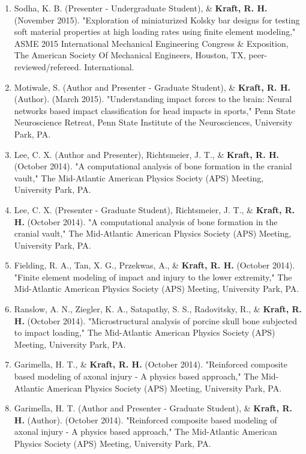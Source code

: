\documentclass[a4paper,10pt]{article}
\begin{document}
\begin{enumerate}
  \item Sodha, K. B. (Presenter - Undergraduate Student), \&
 \textbf{\textbf{Kraft,} R. H.} (November 2015). "Exploration of miniaturized Kolsky bar designs for testing soft material properties at high loading rates using finite element modeling," ASME 2015 International Mechanical Engineering Congress \&
 Exposition, The American Society Of Mechanical Engineers, Houston, TX, peer-reviewed/refereed. International.
  \item Motiwale, S. (Author and Presenter - Graduate Student), \&
 \textbf{\textbf{Kraft,} R. H.} (Author). (March 2015). "Understanding impact forces to the brain: Neural networks based impact classification for head impacts in sports," Penn State Neuroscience Retreat, Penn State Institute of the Neurosciences, University Park, PA.
  \item Lee, C. X. (Author and Presenter), Richtsmeier, J. T., \&
 \textbf{\textbf{Kraft,} R. H.} (October 2014). "A computational analysis of bone formation in the cranial vault," The Mid-Atlantic American Physics Society (APS) Meeting, University Park, PA.
  \item Lee, C. X. (Presenter - Graduate Student), Richtsmeier, J. T., \&
 \textbf{\textbf{Kraft,} R. H.} (October 2014). "A computational analysis of bone formation in the cranial vault," The Mid-Atlantic American Physics Society (APS) Meeting, University Park, PA.
  \item Fielding, R. A., Tan, X. G., Przekwas, A., \&
 \textbf{\textbf{Kraft,} R. H.} (October 2014). "Finite element modeling of impact and injury to the lower extremity," The Mid-Atlantic American Physics Society (APS) Meeting, University Park, PA.
  \item Ranslow, A. N., Ziegler, K. A., Satapathy, S. S., Radovitsky, R., \&
 \textbf{\textbf{Kraft,} R. H.} (October 2014). "Microstructural analysis of porcine skull bone subjected to impact loading," The Mid-Atlantic American Physics Society (APS) Meeting, University Park, PA.
  \item Garimella, H. T., \&
 \textbf{\textbf{Kraft,} R. H.} (October 2014). "Reinforced composite based modeling of axonal injury - A physics based approach," The Mid-Atlantic American Physics Society (APS) Meeting, University Park, PA.
  \item Garimella, H. T. (Author and Presenter - Graduate Student), \&
 \textbf{\textbf{Kraft,} R. H.} (Author). (October 2014). "Reinforced composite based modeling of axonal injury - A physics based approach," The Mid-Atlantic American Physics Society (APS) Meeting, University Park, PA.

\end{enumerate}
\end{document}
